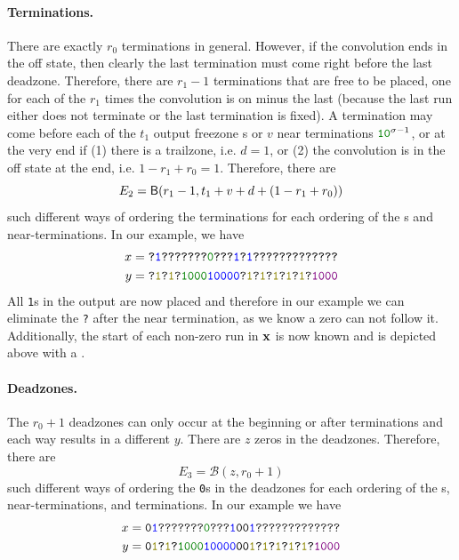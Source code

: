 \paragraph{Terminations.} There are exactly $r_0$ terminations in general. However, if the convolution ends in the off state, then clearly the last termination must come right before the last deadzone. Therefore, there are $r_1-1$ terminations that are free to be placed, one for each of the $r_1$ times the convolution is on minus the last (because the last run either does not terminate or the last termination is fixed).
A termination may come before each of the $t_1$ output freezone s or $v$ near terminations $\green{10}^{\sigma-1}$, or at the very end if (1) there is a trailzone, i.e. $d=1$, or (2) the convolution is in the off state at the end, i.e. $1-r_1+r_0=1$. Therefore, there are
$$
E_2=\mathsf{B}(r_1-1, t_1+v+d+(1-r_1+r_0))
$$
such different ways of ordering the terminations for each ordering of the \texttt{}s and near-terminations. In our example, we have
\begin{align*}
  x&=\texttt{?\blue{1}???????\green{0}???\blue{1}?\blue{1}?????????????}\\
  y&=\texttt{?\olive{1}?\olive{1}?\green{1000}\blue{10000}?\olive{1}?\olive{1}?\olive{1}?\olive{1}?\olive{1}?\textcolor{violet}{1000}}
\end{align*}
All \texttt{1}s in the output are now placed and therefore in our example we can eliminate the \texttt{?} after the near termination, as we know a zero can not follow it. Additionally, the start of each non-zero run in $\mathbf{x}$ is now known and is depicted above with a .

\paragraph{Deadzones.}
The $r_0+1$ deadzones can only occur at the beginning or after terminations and each way results in a different $y$. There are $z$ zeros in the deadzones. Therefore, there are
$$
E_3=\mathcal{B}(z,r_0+1)
$$
such different ways of ordering the \texttt{0}s in the deadzones for each ordering of the \texttt{}s, near-terminations, and terminations. In our example we have
\begin{align*}
  x&=\texttt{0\blue{1}???????\green{0}???\blue{1}00\blue{1}?????????????}\\
  y&=\texttt{0\olive{1}?\olive{1}?\green{1000}\blue{10000}00\olive{1}?\olive{1}?\olive{1}?\olive{1}?\olive{1}?\textcolor{violet}{1000}}
\end{align*}

